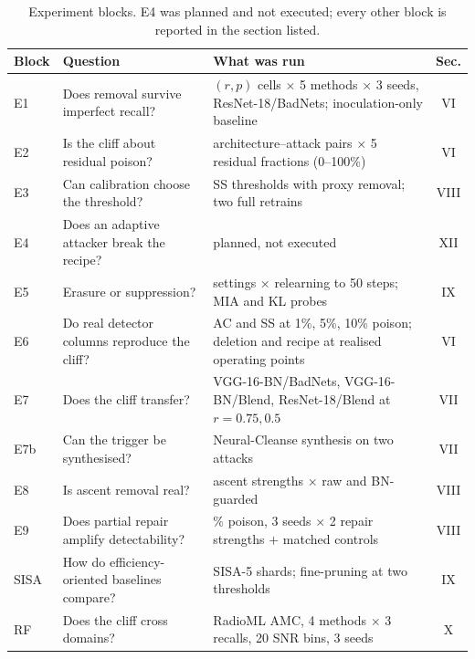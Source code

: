 \begin{table}[t]
\centering
\caption{Experiment blocks. E4 was planned and not executed; every other block is
reported in the section listed.}
\label{tab:blocks}
\footnotesize
\setlength{\tabcolsep}{3.5pt}
\begin{tabular}{@{}l >{\raggedright\arraybackslash}p{} >{\raggedright\arraybackslash}p{} c@{}}
\toprule
\textbf{Block} & \textbf{Question} & \textbf{What was run} & \textbf{Sec.} \\
\midrule
E1 & Does removal survive imperfect recall? & 10 $(r,p)$ cells $\times$ 5 methods $\times$ 3 seeds, ResNet-18/BadNets; inoculation-only baseline & VI \\
E2 & Is the cliff about residual poison? & 4 architecture--attack pairs $\times$ 5 residual fractions (0--100\%) & VI \\
E3 & Can calibration choose the threshold? & 20 SS thresholds with proxy removal; two full retrains & VIII \\
E4 & Does an adaptive attacker break the recipe? & planned, not executed & XII \\
E5 & Erasure or suppression? & 4 settings $\times$ relearning to 50 steps; MIA and KL probes & IX \\
E6 & Do real detector columns reproduce the cliff? & AC and SS at 1\%, 5\%, 10\% poison; deletion and recipe at realised operating points & VI \\
E7 & Does the cliff transfer? & VGG-16-BN/BadNets, VGG-16-BN/Blend, ResNet-18/Blend at $r{=}0.75,0.5$ & VII \\
E7b & Can the trigger be synthesised? & Neural-Cleanse synthesis on two attacks & VII \\
E8 & Is ascent removal real? & 4 ascent strengths $\times$ raw and BN-guarded & VIII \\
E9 & Does partial repair amplify detectability? & 10\% poison, 3 seeds $\times$ 2 repair strengths $+$ matched controls & VIII \\
SISA & How do efficiency-oriented baselines compare? & SISA-5 shards; fine-pruning at two thresholds & IX \\
RF & Does the cliff cross domains? & RadioML AMC, 4 methods $\times$ 3 recalls, 20 SNR bins, 3 seeds & X \\
\bottomrule
\end{tabular}
\end{table}
